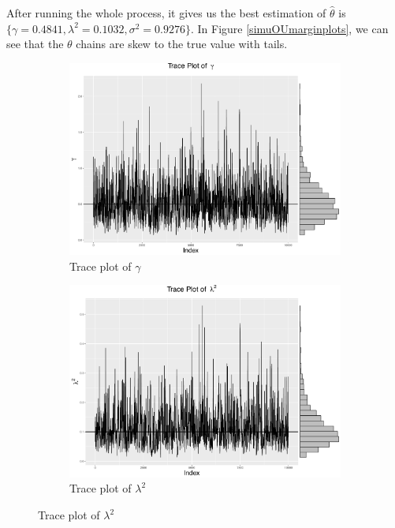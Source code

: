 After running the whole process, it gives us the best estimation of $\hat{\theta}$ is
$\{ \gamma=0.4841, \lambda^2=0.1032, \sigma^2=0.9276\}$. In Figure \ref{simuOUmarginplots}, we can see that the $\theta$ chains are skew to the true value with tails.
\begin{figure}[h]
\centering
 \begin{subfigure}[b]{0.3\textwidth}
     \includegraphics[width=\textwidth]{Chapters/05MCMCOU/plots/simudataOUtracegam.pdf}
     \caption{Trace plot of $\gamma$}
\end{subfigure}
\begin{subfigure}[b]{0.3\textwidth}
    \includegraphics[width=\textwidth]{Chapters/05MCMCOU/plots/simudataOUtracelab2.pdf}
     \caption{Trace plot of $\lambda^2$}
\end{subfigure}

\end{figure}
